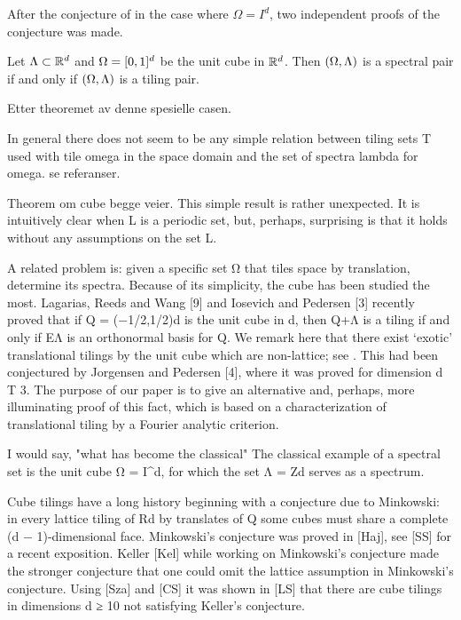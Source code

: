 \documentclass[../thesis.tex]{subfiles}
\begin{document}
After the conjecture of in the case where $\Omega = I^d$, two independent proofs of the conjecture was made. 

\begin{theorem}
    Let $\Lambda\subset \mathbb{R}^d$ and $\Omega=[0,1]^d$ be the unit cube in $\mathbb{R}^d$. Then $(\Omega,\Lambda)$ is a spectral pair if and only if $(\Omega,\Lambda)$ is a tiling pair.
\end{theorem}


Etter theoremet av denne spesielle casen. 

In general there does not seem to be any simple relation between tiling sets T used with tile omega in the space domain and the set of spectra lambda for omega. se referanser. 



Theorem om cube begge veier.
This simple result is rather unexpected. It is intuitively clear when L is a periodic set, but, perhaps, surprising is that it holds without any assumptions on the set L.


A related problem is: given a specific set Ω that tiles space by translation, determine its spectra. Because of its simplicity, the cube has been studied the most. Lagarias, Reeds and Wang [9] and Iosevich and Pedersen [3] recently proved that if Q = (−1/2,1/2)d is the unit cube in d, then Q+Λ is a tiling if and only if EΛ is an orthonormal basis for Q. We remark here that there exist ‘exotic’ translational tilings by the unit cube which are non-lattice; see . This had been conjectured by Jorgensen and Pedersen [4], where it was proved for dimension d T 3. The purpose of our paper is to give an alternative and, perhaps, more illuminating proof of this fact, which is based on a characterization of translational tiling by a Fourier analytic criterion.


I would say, "what has become the classical" 
The classical example of a spectral set is the unit cube Ω = I^d, for which the set Λ = Zd serves as a spectrum.


Cube tilings have a long history beginning with a conjecture due to Minkowski: in every lattice tiling of Rd by translates of Q some cubes must share a complete (d − 1)-dimensional face. Minkowski’s conjecture was proved in [Haj], see [SS] for a recent exposition. Keller [Kel] while working on Minkowski’s conjecture made the stronger conjecture that one could omit the lattice assumption in Minkowski’s conjecture. Using [Sza] and [CS] it was shown in [LS] that there are cube tilings in dimensions d ≥ 10 not satisfying Keller’s conjecture.
\end{document}
